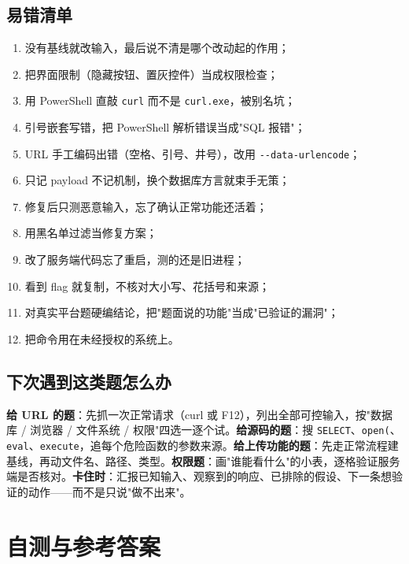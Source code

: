 \documentclass[UTF8,12pt,oneside]{ctexbook}
\begin{document}
\section{易错清单}
\begin{enumerate}
\item 没有基线就改输入，最后说不清是哪个改动起的作用；
\item 把界面限制（隐藏按钮、置灰控件）当成权限检查；
\item 用 PowerShell 直敲 \verb|curl| 而不是 \verb|curl.exe|，被别名坑；
\item 引号嵌套写错，把 PowerShell 解析错误当成"SQL 报错"；
\item URL 手工编码出错（空格、引号、井号），改用 \verb|--data-urlencode|；
\item 只记 payload 不记机制，换个数据库方言就束手无策；
\item 修复后只测恶意输入，忘了确认正常功能还活着；
\item 用黑名单过滤当修复方案；
\item 改了服务端代码忘了重启，测的还是旧进程；
\item 看到 flag 就复制，不核对大小写、花括号和来源；
\item 对真实平台题硬编结论，把"题面说的功能"当成"已验证的漏洞"；
\item 把命令用在未经授权的系统上。
\end{enumerate}

\section{下次遇到这类题怎么办}
\textbf{给 URL 的题}：先抓一次正常请求（curl 或 F12），列出全部可控输入，按"数据库 / 浏览器 / 文件系统 / 权限"四选一逐个试。\textbf{给源码的题}：搜 \verb|SELECT|、\verb|open(|、\verb|eval|、\verb|execute|，追每个危险函数的参数来源。\textbf{给上传功能的题}：先走正常流程建基线，再动文件名、路径、类型。\textbf{权限题}：画"谁能看什么"的小表，逐格验证服务端是否核对。\textbf{卡住时}：汇报已知输入、观察到的响应、已排除的假设、下一条想验证的动作——而不是只说"做不出来"。


\chapter{自测与参考答案}
\label{web:answers}
\end{document}
